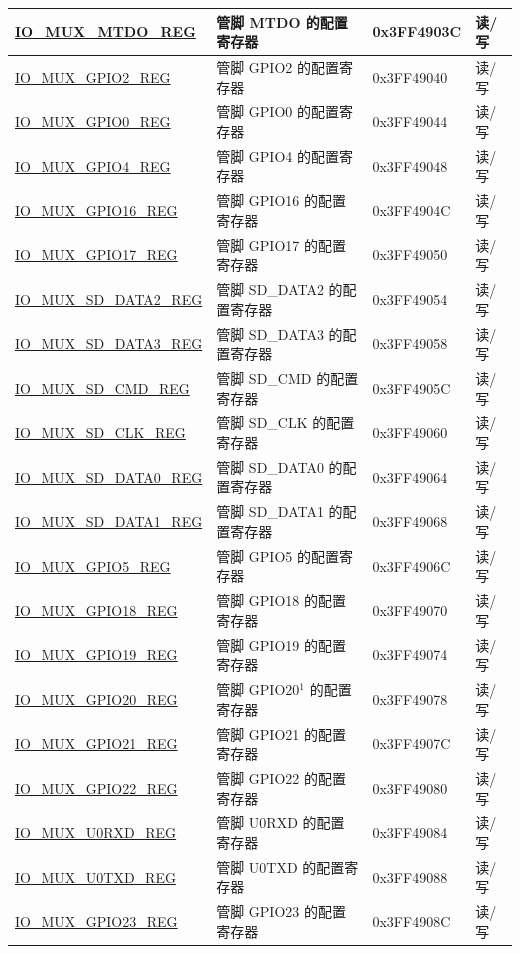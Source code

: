 \begin{longtable}{ | p{5cm} | p{7.5cm} | p{2cm} | p{1cm} | }
\hyperref[regdesc:IOMUXnREG]{IO\_MUX\_MTDO\_REG} & 管脚 MTDO 的配置寄存器 & 0x3FF4903C & 读/写 \\ \hline
\hyperref[regdesc:IOMUXnREG]{IO\_MUX\_GPIO2\_REG} & 管脚 GPIO2 的配置寄存器 & 0x3FF49040 & 读/写 \\ \hline
\hyperref[regdesc:IOMUXnREG]{IO\_MUX\_GPIO0\_REG} & 管脚 GPIO0 的配置寄存器 & 0x3FF49044 & 读/写 \\ \hline
\hyperref[regdesc:IOMUXnREG]{IO\_MUX\_GPIO4\_REG} & 管脚 GPIO4 的配置寄存器 & 0x3FF49048 & 读/写\\ \hline
\hyperref[regdesc:IOMUXnREG]{IO\_MUX\_GPIO16\_REG} & 管脚 GPIO16 的配置寄存器 & 0x3FF4904C & 读/写 \\ \hline
\hyperref[regdesc:IOMUXnREG]{IO\_MUX\_GPIO17\_REG} & 管脚 GPIO17 的配置寄存器 & 0x3FF49050 & 读/写 \\ \hline
\hyperref[regdesc:IOMUXnREG]{IO\_MUX\_SD\_DATA2\_REG} & 管脚 SD\_DATA2 的配置寄存器 & 0x3FF49054 &读/写 \\ \hline
\hyperref[regdesc:IOMUXnREG]{IO\_MUX\_SD\_DATA3\_REG} & 管脚 SD\_DATA3 的配置寄存器 & 0x3FF49058 & 读/写 \\ \hline
\hyperref[regdesc:IOMUXnREG]{IO\_MUX\_SD\_CMD\_REG} & 管脚 SD\_CMD 的配置寄存器 & 0x3FF4905C & 读/写 \\ \hline
\hyperref[regdesc:IOMUXnREG]{IO\_MUX\_SD\_CLK\_REG} & 管脚 SD\_CLK 的配置寄存器 & 0x3FF49060 & 读/写 \\ \hline
\hyperref[regdesc:IOMUXnREG]{IO\_MUX\_SD\_DATA0\_REG} & 管脚 SD\_DATA0 的配置寄存器 & 0x3FF49064 & 读/写\\ \hline
\hyperref[regdesc:IOMUXnREG]{IO\_MUX\_SD\_DATA1\_REG} & 管脚 SD\_DATA1 的配置寄存器 & 0x3FF49068 & 读/写 \\ \hline
\hyperref[regdesc:IOMUXnREG]{IO\_MUX\_GPIO5\_REG} & 管脚 GPIO5 的配置寄存器 & 0x3FF4906C & 读/写 \\ \hline
\hyperref[regdesc:IOMUXnREG]{IO\_MUX\_GPIO18\_REG} & 管脚 GPIO18 的配置寄存器 & 0x3FF49070 & 读/写 \\ \hline
\hyperref[regdesc:IOMUXnREG]{IO\_MUX\_GPIO19\_REG} & 管脚 GPIO19 的配置寄存器 & 0x3FF49074 & 读/写 \\ \hline
\hyperref[regdesc:IOMUXnREG]{IO\_MUX\_GPIO20\_REG} & 管脚 GPIO20$^1$ 的配置寄存器 & 0x3FF49078 & 读/写 \\ \hline
\hyperref[regdesc:IOMUXnREG]{IO\_MUX\_GPIO21\_REG} & 管脚 GPIO21 的配置寄存器 & 0x3FF4907C & 读/写 \\ \hline
\hyperref[regdesc:IOMUXnREG]{IO\_MUX\_GPIO22\_REG} & 管脚 GPIO22 的配置寄存器 & 0x3FF49080 & 读/写 \\ \hline
\hyperref[regdesc:IOMUXnREG]{IO\_MUX\_U0RXD\_REG} & 管脚 U0RXD 的配置寄存器 & 0x3FF49084 & 读/写 \\ \hline
\hyperref[regdesc:IOMUXnREG]{IO\_MUX\_U0TXD\_REG} & 管脚 U0TXD 的配置寄存器 & 0x3FF49088 & 读/写 \\ \hline
\hyperref[regdesc:IOMUXnREG]{IO\_MUX\_GPIO23\_REG} & 管脚 GPIO23 的配置寄存器 & 0x3FF4908C & 读/写 \\ \hline
\end{longtable}

